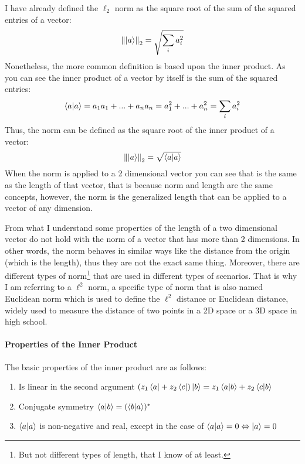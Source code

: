 I have already defined the $\ell_2$ norm as the square root of the sum of the squared entries of a vector: 
$$
\norm{\ket{a}}_2 = \sqrt{\sum_{i} a_{i}^2}
$$
Nonetheless, the more common definition is based upon the inner product. As you can see the inner product of a vector by itself is the sum of the squared entries: 
$$
\bra{a}\ket{a} = a_1 a_1 + ... + a_n a_n = a_1^2 + ... +  a_n^2 \\= \sum_{i} a_i^2
$$
Thus, the norm can be defined as the square root of the inner product of a vector:
\begin{equation}
\norm{\ket{a}}_2 = \sqrt{\bra{a}\ket{a}}
\label{eq:norm}
\end{equation}
When the norm is applied to a 2 dimensional vector you can see that is the same as the length of that vector, that is because norm and length are the same concepts, however, the norm is the generalized length that can be applied to a vector of any dimension. 


From what I understand some properties of the length of a two dimensional vector do not hold with the norm of a vector that has more than 2 dimensions. In other words, the norm behaves in similar ways like the distance from the origin (which is the length), thus they are not the exact same thing. Moreover, there are different types of norm\footnote{But not different types of length, that I know of at least.} that are used in different types of scenarios. That is why I am referring to a $\ell^2$ norm, a specific type of norm that is also named Euclidean norm which is used to define the $\ell^2$ distance or Euclidean distance, widely used to measure the distance of two points in a 2D space or a 3D space in high school. \tocite \\
\paragraph{Properties of the Inner Product}
The basic properties of the inner product are as follows:
\begin{enumerate}
	\item Is linear in the second argument $ (z_1\bra{a}+ z_2\bra{c})\ket{b} = z_1\bra{a}\ket{b} + z_2\bra{c}\ket{b}$
	\item Conjugate symmetry $\bra{a}\ket{b} = (\bra{b}\ket{a})^*$
	\item $\bra{a}\ket{a}$ is non-negative and real, except in the case of $\bra{a}\ket{a} = 0 \Leftrightarrow \ket{a} = 0$
\end{enumerate}

